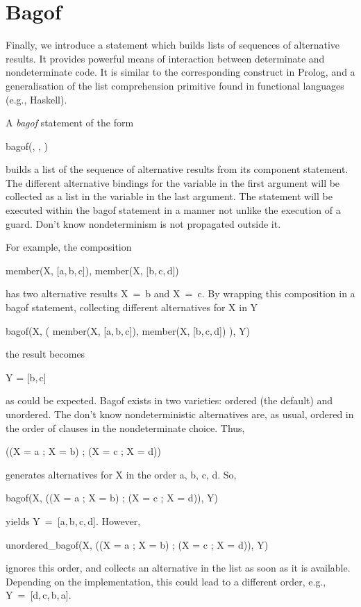 \section{Bagof}

Finally, we introduce a statement which builds lists of sequences of
alternative results.  It provides powerful means of interaction
between determinate and nondeterminate code.  It is similar to the
corresponding construct in Prolog, and a generalisation of the list
comprehension primitive found in functional languages (e.g., Haskell).

A {\em bagof} statement of the form
%
\begin{progex}
bagof(, , )
\end{progex}%
%
builds a list of the sequence of alternative results from its
component statement.  The different alternative bindings for the
variable in the first argument will be collected as a list in the
variable in the last argument.  The statement will be executed within
the bagof statement in a manner not unlike the execution of a
guard.  Don't know nondeterminism is not propagated outside it.

For example, the composition
%
\begin{progex}
member(X, [a,\,b,\,c]), member(X, [b,\,c,\,d])
\end{progex}%
%
has two alternative results {\prog X~=~b} and {\prog X~=~c}.  By
wrapping this composition in a bagof statement, collecting different
alternatives for {\prog X} in {\prog Y}
%
\begin{progex}
bagof(X, ( member(X, [a,\,b,\,c]), member(X, [b,\,c,\,d]) ), Y)
\end{progex}%
%
the result becomes
%
\begin{progex}
Y = [b,\,c]
\end{progex}%
%
as could be expected.  Bagof exists in two varieties: ordered (the
default) and unordered.  The don't know nondeterministic alternatives
are, as usual, ordered in the order of clauses in the nondeterminate
choice.  Thus,
%
\begin{progex}
((X = a ; X = b) ; (X = c ; X = d))
\end{progex}%
%
generates alternatives for X in the order a, b, c, d.  So,
%
\begin{progex}
bagof(X, ((X = a ; X = b) ; (X = c ; X = d)), Y)
\end{progex}%
%
yields {\prog Y~=~[a,\,b,\,c,\,d]}.  However,
%
\begin{progex}
unordered_bagof(X, ((X = a ; X = b) ; (X = c ; X = d)), Y)
\end{progex}%
%
ignores this order, and collects an alternative in the list as soon as
it is available.  Depending on the implementation, this could lead to
a different order, e.g., {\prog Y~=~[d,\,c,\,b,\,a]}.


